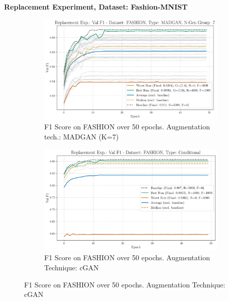 \newpage
\noindent\textbf{Replacement Experiment, Dataset: Fashion-MNIST}
\begin{figure}[H]
	\centering
	\begin{subfigure}{.85\textwidth}
		\includegraphics[width=\textwidth]{abb/strat_classifier_performance/FASHION_STRATIFIED_CLASSIFIERS_MADGAN_NEW/replacement_experiments/val_f1_score_MADGAN_FASHION_n_gen_7_all.png}
		\caption{F1 Score on FASHION over 50 epochs. Augmentation tech.: MADGAN (K=7)}
        \label{fig:res_replacement_fashion_cgan_vs_madgan__madgan}
	\end{subfigure}
	\begin{subfigure}{.85\textwidth}
		\includegraphics[width=\textwidth]{abb/strat_classifier_performance/FASHION_STRATIFIED_CLASSIFIERS_COND_GAN/replacement_experiments/val_f1_score_['COND']_FASHION_all.png}
		\caption{F1 Score on FASHION over 50 epochs. Augmentation Technique: cGAN}
        \label{fig:res_replacement_fashion_cgan_vs_madgan__cgan}
	\end{subfigure}
\end{figure}

